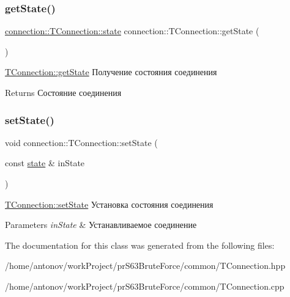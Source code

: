 \subsubsection{\texorpdfstring{get\+State()}{getState()}}
{\footnotesize\ttfamily \hyperlink{classconnection_1_1_t_connection_aee7dfb7510592bd2697ab6f906b9612c}{connection\+::\+T\+Connection\+::state} connection\+::\+T\+Connection\+::get\+State (\begin{DoxyParamCaption}{ }\end{DoxyParamCaption})}



\hyperlink{classconnection_1_1_t_connection_a7944d50c5733279cf0fdfd8c87c3b237}{T\+Connection\+::get\+State} Получение состояния соединения 

\begin{DoxyReturn}{Returns}
Состояние соединения 
\end{DoxyReturn}
\mbox{\label{classconnection_1_1_t_connection_aa61ae6037f6b70cd97c9fc9c04f43629}} 
\subsubsection{\texorpdfstring{set\+State()}{setState()}}
{\footnotesize\ttfamily void connection\+::\+T\+Connection\+::set\+State (\begin{DoxyParamCaption}\item[{const \hyperlink{classconnection_1_1_t_connection_aee7dfb7510592bd2697ab6f906b9612c}{state} \&}]{in\+State }\end{DoxyParamCaption})}



\hyperlink{classconnection_1_1_t_connection_aa61ae6037f6b70cd97c9fc9c04f43629}{T\+Connection\+::set\+State} Установка состояния соединения 


\begin{DoxyParams}{Parameters}
{\em in\+State} & Устанавливаемое соединение \\
\hline
\end{DoxyParams}


The documentation for this class was generated from the following files\+:\begin{DoxyCompactItemize}
\item 
/home/antonov/work\+Project/pr\+S63\+Brute\+Force/common/T\+Connection.\+hpp\item 
/home/antonov/work\+Project/pr\+S63\+Brute\+Force/common/T\+Connection.\+cpp\end{DoxyCompactItemize}
